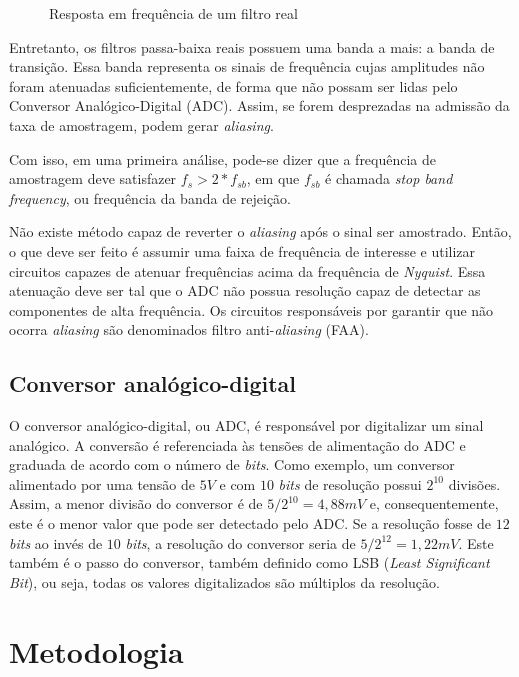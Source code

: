\documentclass[11pt]{abntex2}
\begin{document}
\begin{figure}[!ht]
\begin{minipage}{.4\linewidth}
						\caption{Resposta em frequência de um filtro real}
					\end{minipage}
				\end{figure}

				Entretanto, os filtros passa-baixa reais possuem uma banda a
				mais: a banda de transição. Essa banda representa os sinais de
				frequência cujas amplitudes não foram atenuadas suficientemente,
				de forma que não possam ser lidas pelo Conversor Analógico-Digital
				(ADC). Assim, se forem desprezadas na admissão da taxa de amostragem,
				podem gerar \textit{aliasing}.

				Com isso, em uma primeira análise, pode-se dizer que a frequência de
				amostragem deve satisfazer $f_s>2*f_{sb}$, em que $f_{sb}$ é chamada
				\textit{stop band frequency}, ou frequência da banda de rejeição.

				Não existe método capaz de reverter o \textit{aliasing} após o
				sinal ser amostrado. Então, o que deve ser feito é assumir uma
				faixa de frequência de interesse e utilizar circuitos capazes de
				atenuar frequências acima da frequência de \textit{Nyquist}.
				Essa atenuação deve ser tal que o ADC não possua resolução capaz
				de detectar as componentes de alta frequência. Os circuitos
				responsáveis por garantir que não ocorra \textit{aliasing} são
				denominados filtro anti-\textit{aliasing} (FAA).

			\section{Conversor analógico-digital}
				O conversor analógico-digital, ou ADC, é responsável por digitalizar
				um sinal analógico. A conversão é referenciada às tensões de alimentação
				do ADC e graduada de acordo com o número de \textit{bits}. Como exemplo,
				um conversor alimentado por uma tensão de $5V$ e com $10$ \textit{bits} de
				resolução possui $2^{10}$ divisões. Assim, a menor divisão do conversor é
				de $5/2^{10} = 4,88mV$ e, consequentemente, este é o menor valor que pode
				ser detectado pelo ADC. Se a resolução fosse de $12$ \textit{bits} ao invés
				de $10$ \textit{bits}, a resolução do conversor seria de $5/2^{12}=1,22mV$.
				Este também é o passo do conversor, também definido como LSB
				(\textit{Least Significant Bit}), ou seja, todas os valores digitalizados
				são múltiplos da resolução.

		\chapter{Metodologia}
\end{document}
